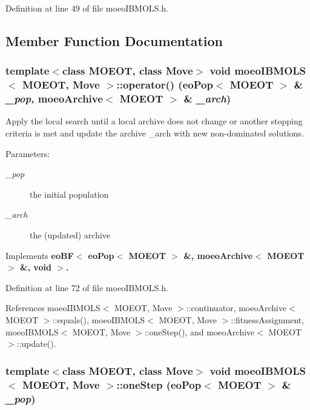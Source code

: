 Definition at line 49 of file moeo\-IBMOLS.h.

\subsection{Member Function Documentation}
\subsubsection{\setlength{\rightskip}{0pt plus 5cm}template$<$class MOEOT, class Move$>$ void \bf{moeo\-IBMOLS}$<$ MOEOT, Move $>$::operator() (\bf{eo\-Pop}$<$ MOEOT $>$ \& {\em \_\-pop}, \bf{moeo\-Archive}$<$ MOEOT $>$ \& {\em \_\-arch})\hspace{0.3cm}{\tt  [inline, virtual]}}\label{classmoeoIBMOLS_fd788bbc4f956dec932dba2a4d4479b6}


Apply the local search until a local archive does not change or another stopping criteria is met and update the archive \_\-arch with new non-dominated solutions. 

\begin{Desc}
\item[Parameters:]
\begin{description}
\item[{\em \_\-pop}]the initial population \item[{\em \_\-arch}]the (updated) archive \end{description}
\end{Desc}


Implements \bf{eo\-BF$<$ eo\-Pop$<$ MOEOT $>$ \&, moeo\-Archive$<$ MOEOT $>$ \&, void $>$}.

Definition at line 72 of file moeo\-IBMOLS.h.

References moeo\-IBMOLS$<$ MOEOT, Move $>$::continuator, moeo\-Archive$<$ MOEOT $>$::equals(), moeo\-IBMOLS$<$ MOEOT, Move $>$::fitness\-Assignment, moeo\-IBMOLS$<$ MOEOT, Move $>$::one\-Step(), and moeo\-Archive$<$ MOEOT $>$::update().
\subsubsection{\setlength{\rightskip}{0pt plus 5cm}template$<$class MOEOT, class Move$>$ void \bf{moeo\-IBMOLS}$<$ MOEOT, Move $>$::one\-Step (\bf{eo\-Pop}$<$ MOEOT $>$ \& {\em \_\-pop})\hspace{0.3cm}{\tt  [inline, private]}}\label{classmoeoIBMOLS_fce770398602972b5d67c52638687d43}


